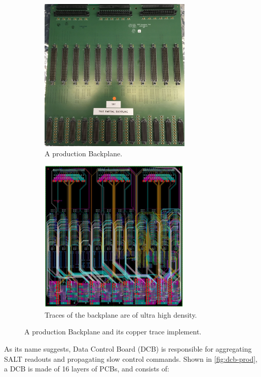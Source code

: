 \begin{figure}[!htb]
    \centering
    \begin{subfigure}[t]{0.48\textwidth}
        \centering
        \includegraphics[height=20em]{./figs-ut-upgrade/backplane/backplane_compressed.jpg}
        \caption{
            A production Backplane.
        }
    \end{subfigure}
    \hspace{10pt}
    \begin{subfigure}[t]{0.48\textwidth}
        \centering
        \includegraphics[height=20em]{./figs-ut-upgrade/backplane/backplane_trace.pdf}
        \caption{
            Traces of the backplane are of ultra high density.
        }
    \end{subfigure}

    \caption{
        A production Backplane and its copper trace implement.
    }
    \label{fig:backplane}
\end{figure}

As its name suggests, Data Control Board (DCB) is responsible for aggregating
SALT readouts and propagating slow control commands.
Shown in \cref{fig:dcb-prod}, a DCB is made of 16 layers of PCBs,
and consists of:

